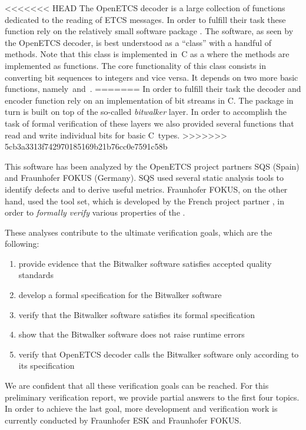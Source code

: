 \FloatBarrier

<<<<<<< HEAD
The OpenETCS decoder is a large collection of functions dedicated to
the reading of ETCS messages.
In order to fulfill their task these function rely on the relatively
small software package .
The  software, as seen by the OpenETCS decoder,
is best understood as a ``class'' with a handful of methods.
Note that this class is implemented in~C as a  where
the methods are implemented as functions.
The core functionality  of this class consists in converting bit sequences to integers
and vice versa. It depends on two more basic functions, namely~\peek and~\poke.
=======
In order to fulfill their task the decoder and encoder function rely on an
implementation of bit streams in C.
The  package in turn is built on top of the so-called \emph{bitwalker} layer.
In order to accomplish the task of formal verification of these layers 
we also provided several functions that read and write individual bits for basic C~types.
>>>>>>> 5cb3a3313f742970185169b21b76cc0e7591c58b

This software has been analyzed by the OpenETCS project partners SQS (Spain)
and Fraunhofer FOKUS (Germany).
SQS used several static analysis tools to identify defects and to derive useful metrics.
Fraunhofer FOKUS, on the other hand, used the \framac tool set,
which is developed by the French project partner \cealist,
in order to \emph{formally verify} various properties of the \bitwalker.

These analyses contribute to the ultimate verification goals, which are the following:

\begin{enumerate}
\item provide evidence that the Bitwalker software satisfies 
      accepted quality standards
\item develop a formal specification for the Bitwalker software
\item verify that the Bitwalker software satisfies its formal specification
\item show that the Bitwalker software does not raise runtime errors
\item verify that OpenETCS decoder calls the Bitwalker software only
      according to its specification
\end{enumerate}

We are confident that all these verification goals can be reached.
For this preliminary verification report,
we provide partial answers to the first four topics.
In order to achieve the last goal, more development and verification
work is currently conducted by Fraunhofer ESK and Fraunhofer FOKUS. 

